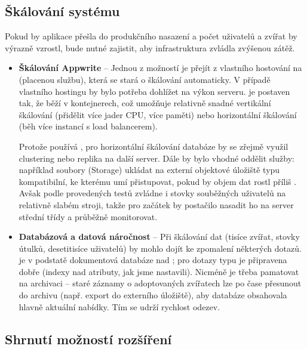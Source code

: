 \documentclass[czech, bp, kiv, he, iso690numb, pdf]{fasthesis}
\begin{document}
    \subsection*{Škálování systému}

    Pokud by aplikace přešla do produkčního nasazení a počet uživatelů a zvířat by výrazně vzrostl, bude nutné zajistit, aby infrastruktura zvládla zvýšenou zátěž.

    \begin{itemize}
        \item \textbf{Škálování Appwrite} – Jednou z možností je přejít z vlastního hostování na  (placenou službu), která se stará o škálování automaticky. V případě vlastního hostingu by bylo potřeba dohlížet na výkon serveru.  je postaven tak, že běží v  kontejnerech, což umožňuje relativně snadné vertikální škálování (přidělit více jader CPU, více paměti) nebo horizontální škálování (běh více instancí s load balancerem).

        Protože  používá , pro horizontální škálování databáze by se zřejmě využil clustering nebo replika na další server. Dále by bylo vhodné oddělit služby: například soubory (Storage) ukládat na externí objektové úložiště typu  kompatibilní, ke kterému  umí přistupovat, pokud by objem dat rostl příliš \cite{appwrite-storage}. Avšak podle provedených testů  zvládne i stovky souběžných uživatelů na relativně slabém stroji, takže pro začátek by postačilo nasadit ho na server střední třídy a průběžně monitorovat.


        \item \textbf{Databázová a datová náročnost} – Při škálování dat (tisíce zvířat, stovky útulků, desetitisíce uživatelů) by mohlo dojít ke zpomalení některých dotazů.  je v podstatě dokumentová databáze nad ; pro dotazy typu  je připravena dobře (indexy nad atributy, jak jsme nastavili). Nicméně je třeba pamatovat na archivaci – staré záznamy o adoptovaných zvířatech lze po čase přesunout do archivu (např. export do externího úložiště), aby databáze obsahovala hlavně aktuální nabídky. Tím se udrží rychlost odezev.

    \end{itemize}

    \subsection*{Shrnutí možností rozšíření}
\end{document}
